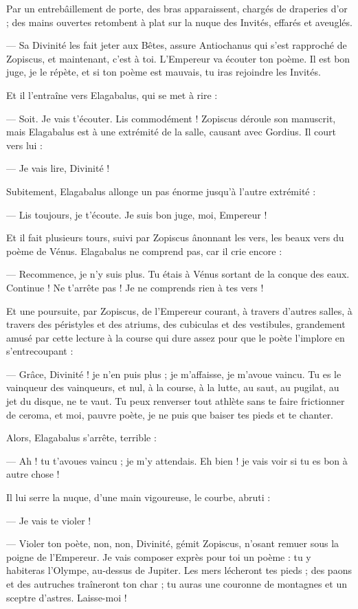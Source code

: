 \documentclass[a4paper, 11pt, oneside, polutonikogreek, french]{article}
\begin{document}
Par un entrebâillement de porte, des bras apparaissent, chargés de draperies d'or ; des mains ouvertes retombent à plat sur la nuque des Invités, effarés et aveuglés.

--- Sa Divinité les fait jeter aux Bêtes, assure Antiochanus qui s'est rapproché de Zopiscus, et maintenant, c'est à toi. L'Empereur va écouter ton poème. Il est bon juge, je le répète, et si ton poème est mauvais, tu iras rejoindre les Invités.

Et il l'entraîne vers Elagabalus, qui se met à rire :

--- Soit. Je vais t'écouter. Lis commodément ! Zopiscus déroule son manuscrit, mais Elagabalus est à une extrémité de la salle, causant avec Gordius. Il court vers lui :

--- Je vais lire, Divinité !

Subitement, Elagabalus allonge un pas énorme jusqu'à l'autre extrémité :

--- Lis toujours, je t'écoute. Je suis bon juge, moi, Empereur !

Et il fait plusieurs tours, suivi par Zopiscus ânonnant les vers, les beaux vers du poème de Vénus. Elagabalus ne comprend pas, car il crie encore :

--- Recommence, je n'y suis plus. Tu étais à Vénus sortant de la conque des eaux. Continue ! Ne t'arrête pas ! Je ne comprends rien à tes vers !

Et une poursuite, par Zopiscus, de l'Empereur courant, à travers d'autres salles, à travers des péristyles et des atriums, des cubiculas et des vestibules, grandement amusé par cette lecture à la course qui dure assez pour que le poète l'implore en s'entrecoupant :

--- Grâce, Divinité ! je n'en puis plus ; je m'affaisse, je m'avoue vaincu. Tu es le vainqueur des vainqueurs, et nul, à la course, à la lutte, au saut, au pugilat, au jet du disque, ne te vaut. Tu peux renverser tout athlète sans te faire frictionner de ceroma, et moi, pauvre poète, je ne puis que baiser tes pieds et te chanter.

Alors, Elagabalus s'arrête, terrible :

--- Ah ! tu t'avoues vaincu ; je m'y attendais. Eh bien ! je vais voir si tu es bon à autre chose !

Il lui serre la nuque, d'une main vigoureuse, le courbe, abruti :

--- Je vais te violer !

--- Violer ton poète, non, non, Divinité, gémit Zopiscus, n'osant remuer sous la poigne de l'Empereur. Je vais composer exprès pour toi un poème : tu y habiteras l'Olympe, au-dessus de Jupiter. Les mers lécheront tes pieds ; des paons et des autruches traîneront ton char ; tu auras une couronne de montagnes et un sceptre d'astres. Laisse-moi !
\end{document}

